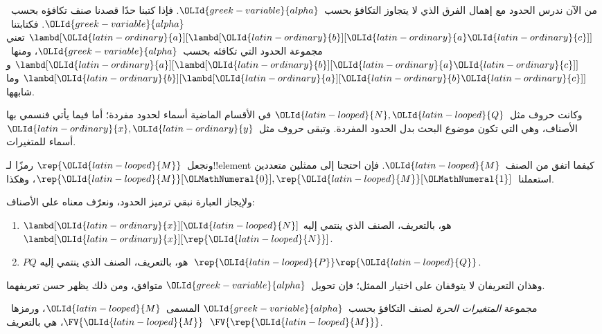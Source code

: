 \documentclass[../../../include/open-logic-section]{subfiles}
\begin{document}

من الآن ندرس الحدود مع إهمال الفرق الذي لا يتجاوز التكافؤ بحسب~${\OLId{greek-variable}{alpha}}$.
فإذا كتبنا حدًا قصدنا صنف تكافؤه بحسب~${\OLId{greek-variable}{alpha}}$.
فكتابتنا~$\lambd[{\OLId{latin-ordinary}{a}}][\lambd[{\OLId{latin-ordinary}{b}}][{\OLId{latin-ordinary}{a}} {\OLId{latin-ordinary}{c}}]]$ تعني مجموعة الحدود التي تكافئه بحسب~${\OLId{greek-variable}{alpha}}$،
ومنها~$\lambd[{\OLId{latin-ordinary}{a}}][\lambd[{\OLId{latin-ordinary}{b}}][{\OLId{latin-ordinary}{a}} {\OLId{latin-ordinary}{c}}]]$ و$\lambd[{\OLId{latin-ordinary}{b}}][\lambd[{\OLId{latin-ordinary}{a}}][{\OLId{latin-ordinary}{b}} {\OLId{latin-ordinary}{c}}]]$ وما شابهها.

وكانت حروف مثل~${\OLId{latin-looped}{N}}, {\OLId{latin-looped}{Q}}$ في الأقسام الماضية أسماء لحدود مفردة؛
أما فيما يأتي فنسمي بها الأصناف، وهي التي تكون موضوع البحث بدل الحدود المفردة.
وتبقى حروف مثل~${\OLId{latin-ordinary}{x}}, {\OLId{latin-ordinary}{y}}$ أسماء للمتغيرات.

ونجعل~$\rep{{\OLId{latin-looped}{M}}}$ رمزًا لـ!!{element} كيفما اتفق من الصنف~${\OLId{latin-looped}{M}}$.
فإن احتجنا إلى ممثلين متعددين استعملنا~$\rep{{\OLId{latin-looped}{M}}}[{\OLMathNumeral{0}}], \rep{{\OLId{latin-looped}{M}}}[{\OLMathNumeral{1}}]$، وهكذا.

ولإيجاز العبارة نبقي ترميز الحدود، ونعرّف معناه على الأصناف:
\begin{defn}
  \begin{enumerate}
  \item $\lambd[{\OLId{latin-ordinary}{x}}][{\OLId{latin-looped}{N}}]$ هو، بالتعريف، الصنف الذي ينتمي إليه
    $\lambd[{\OLId{latin-ordinary}{x}}][\rep{{\OLId{latin-looped}{N}}}]$.
  \item $PQ$ هو، بالتعريف، الصنف الذي ينتمي إليه~$\rep{{\OLId{latin-looped}{P}}}\rep{{\OLId{latin-looped}{Q}}}$.
  \end{enumerate}
\end{defn}

وهذان التعريفان لا يتوقفان على اختيار الممثل؛ فإن تحويل~${\OLId{greek-variable}{alpha}}$ متوافق، ومن ذلك يظهر حسن تعريفهما.

\begin{defn} 
  مجموعة \emph{المتغيرات الحرة} لصنف التكافؤ بحسب~${\OLId{greek-variable}{alpha}}$ المسمى~${\OLId{latin-looped}{M}}$،
  ورمزها~$\FV{{\OLId{latin-looped}{M}}}$، هي بالتعريف~$\FV{\rep{{\OLId{latin-looped}{M}}}}$.
\end{defn}
\end{document}
